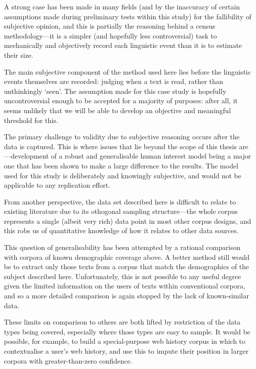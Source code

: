 A strong case has been made in many fields (and by the inaccuracy of certain assumptions made during preliminary tests within this study) for the fallibility of subjective opinion, and this is partially the reasoning behind a census methodology---it is a simpler (and hopefully less controversial) task to mechanically and objectively record each linguistic event than it is to estimate their size.

The main subjective component of the method used here lies before the linguistic events themselves are recorded: judging when a text is read, rather than unthinkingly `seen'.  The assumption made for this case study is hopefully uncontroversial enough to be accepted for a majority of purposes: after all, it seems unlikely that we will be able to develop an objective and meaningful threshold for this.

The primary challenge to validity due to subjective reasoning occurs after the data is captured.  This is where issues that lie beyond the scope of this thesis are---development of a robust and generalisable human interest model being a major one that has been shown to make a large difference to the results.  The model used for this study is deliberately and knowingly subjective, and would not be applicable to any replication effort.

From another perspective, the data set described here is difficult to relate to existing literature due to its othogonal sampling structure---the whole corpus represents a single (albeit very rich) data point in most other corpus designs, and this robs us of quantitative knowledge of how it relates to other data sources.

This question of generalisability has been attempted by a rational comparison with corpora of known demographic coverage above.  A better method still would be to extract only those texts from a corpus that match the demographics of the subject described here.  Unfortunately, this is not possible to any useful degree given the limited information on the users of texts within conventional corpora, and so a more detailed comparison is again stopped by the lack of known-similar data.

These limits on comparison to others are both lifted by restriction of the data types being covered, especially where those types are easy to sample.  It would be possible, for example, to build a special-purpose web history corpus in which to contextualise a user's web history, and use this to impute their position in larger corpora with greater-than-zero confidence.







